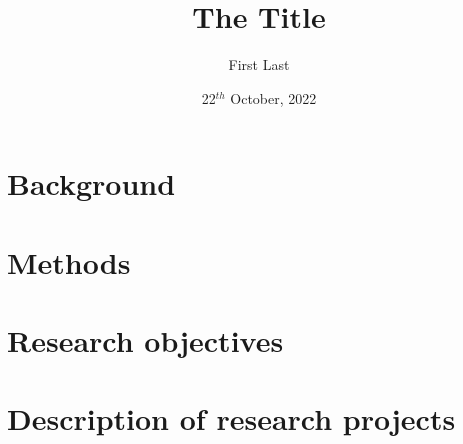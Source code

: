 \documentclass[10pt,b5paper,twoside,openany]{memoir}
\title{The Title}
\author{First Last}
\date{22$^{th}$ October, 2022}
\begin{document}
\setcounter{page}{0}


\frontmatter






\renewcommand*\contentsname{Table of contents}
\tableofcontents*






\clearpage




\mainmatter
\setcounter{page}{1}

\setcounter{secnumdepth}{3}
\newpage






\pagestyle{dtu}

\cleardoublepage
\begingroup

\chapter{Background}

\endgroup

\begingroup
\chapter{Methods} 

\endgroup

\begingroup
\chapter{Research objectives}


\chapter{Description of research projects}

\endgroup
\end{document}
